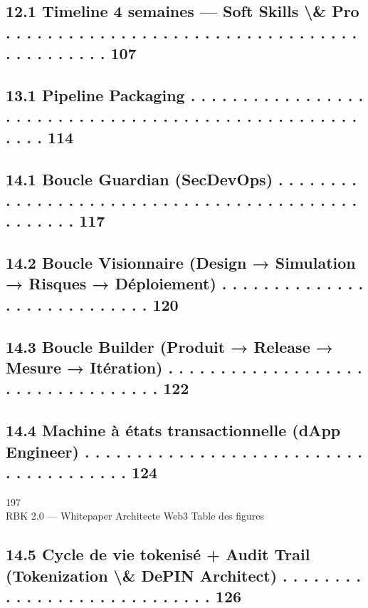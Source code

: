 \subsection{12.1 Timeline 4 semaines — Soft Skills \textbackslash{}& Pro . . . . . . . . . . . . . . . . . . . . . . . . . . . . . . . . . . . . . . . . . . . . 107}
\vspace{0.5em}
\subsection{13.1 Pipeline Packaging . . . . . . . . . . . . . . . . . . . . . . . . . . . . . . . . . . . . . . . . . . . . . . . . . . . . . . . 114}
\vspace{0.5em}
\subsection{14.1 Boucle Guardian (SecDevOps) . . . . . . . . . . . . . . . . . . . . . . . . . . . . . . . . . . . . . . . . . . . . . . . . . 117}
\subsection{14.2 Boucle Visionnaire (Design → Simulation → Risques → Déploiement) . . . . . . . . . . . . . . . . . . . . . . . . . . . . 120}
\subsection{14.3 Boucle Builder (Produit → Release → Mesure → Itération) . . . . . . . . . . . . . . . . . . . . . . . . . . . . . . . . . . 122}
\subsection{14.4 Machine à états transactionnelle (dApp Engineer) . . . . . . . . . . . . . . . . . . . . . . . . . . . . . . . . . . . . . . . 124}
\vspace{0.5em}
\vspace{0.5em}
\vspace{0.5em}
197\\
RBK 2.0 — Whitepaper Architecte Web3                                                                                        Table des figures\\
\vspace{0.5em}
\vspace{0.5em}
\subsection{14.5 Cycle de vie tokenisé + Audit Trail (Tokenization \textbackslash{}& DePIN Architect) . . . . . . . . . . . . . . . . . . . . . . . . . . . . 126}
\vspace{0.5em}
